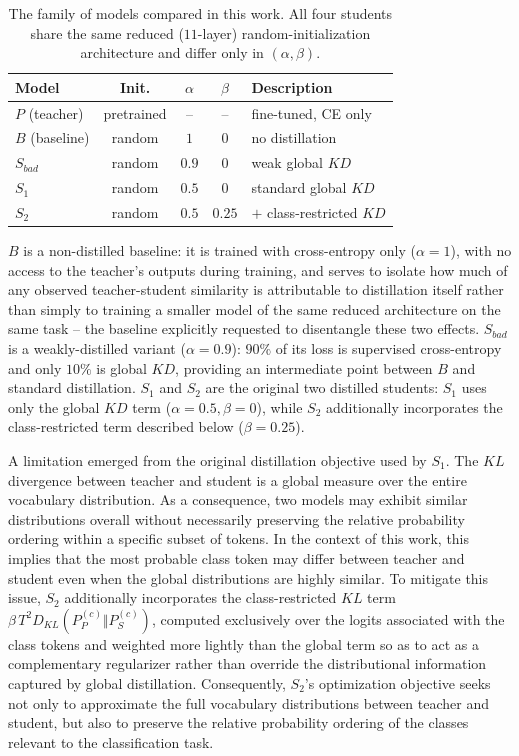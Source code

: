 \documentclass[conference]{IEEEtran}
\begin{document}
\begin{table}[h!]
\centering
\caption{The family of models compared in this work. All four students share the same reduced ($11$-layer) random-initialization architecture and differ only in $(\alpha,\beta)$.}
\begin{tabular}{|l|c|c|c|l|}
\hline
Model & Init. & $\alpha$ & $\beta$ & Description \\ \hline
$P$ (teacher) & pretrained & -- & -- & fine-tuned, CE only \\
$B$ (baseline) & random & $1$ & $0$ & no distillation \\
$S_{bad}$ & random & $0.9$ & $0$ & weak global $KD$ \\
$S_1$ & random & $0.5$ & $0$ & standard global $KD$ \\
$S_2$ & random & $0.5$ & $0.25$ & $+$ class-restricted $KD$ \\ \hline
\end{tabular}
\label{tab:model_family}
\end{table}

$B$ is a non-distilled baseline: it is trained with cross-entropy only ($\alpha=1$), with no access to the teacher's outputs during training, and serves to isolate how much of any observed teacher-student similarity is attributable to distillation itself rather than simply to training a smaller model of the same reduced architecture on the same task -- the baseline explicitly requested to disentangle these two effects. $S_{bad}$ is a weakly-distilled variant ($\alpha=0.9$): $90\%$ of its loss is supervised cross-entropy and only $10\%$ is global $KD$, providing an intermediate point between $B$ and standard distillation. $S_1$ and $S_2$ are the original two distilled students: $S_1$ uses only the global $KD$ term ($\alpha=0.5,\beta=0$), while $S_2$ additionally incorporates the class-restricted term described below ($\beta=0.25$).

A limitation emerged from the original distillation objective used by $S_1$. The $KL$ divergence between teacher and student is a global measure over the entire vocabulary distribution. As a consequence, two models may exhibit similar distributions overall without necessarily preserving the relative probability ordering within a specific subset of tokens. In the context of this work, this implies that the most probable class token may differ between teacher and student even when the global distributions are highly similar. To mitigate this issue, $S_2$ additionally incorporates the class-restricted $KL$ term $\beta\,T^2 D_{KL}(P_P^{(c)}\Vert P_S^{(c)})$, computed exclusively over the logits associated with the class tokens and weighted more lightly than the global term so as to act as a complementary regularizer rather than override the distributional information captured by global distillation. Consequently, $S_2$'s optimization objective seeks not only to approximate the full vocabulary distributions between teacher and student, but also to preserve the relative probability ordering of the classes relevant to the classification task.
\end{document}
